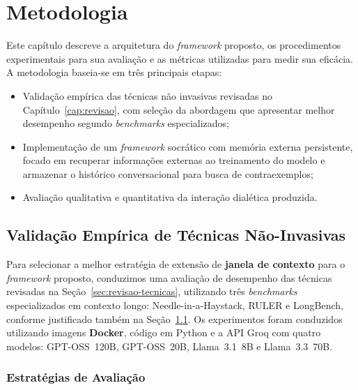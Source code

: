 \chapter{Metodologia}
\label{cap:metodologia}

Este capítulo descreve a arquitetura do \textit{framework} proposto, os procedimentos experimentais para sua avaliação e as métricas utilizadas para medir sua eficácia. A metodologia baseia-se em três principais etapas:
\begin{itemize}
    \item Validação empírica das técnicas não invasivas revisadas no Capítulo~\ref{cap:revisao}, com seleção da abordagem que apresentar melhor desempenho segundo \textit{benchmarks} especializados;

    \item Implementação de um \textit{framework} socrático com memória externa persistente, focado em recuperar informações externas ao treinamento do modelo e armazenar o histórico conversacional para busca de contraexemplos;

    \item Avaliação qualitativa e quantitativa da interação dialética produzida.
\end{itemize}

\section{Validação Empírica de Técnicas Não-Invasivas}
\label{sec:validacao-tecnicas}

Para selecionar a melhor estratégia de extensão de \textbf{janela de contexto} para o \textit{framework} proposto, conduzimos uma avaliação de desempenho das técnicas revisadas na Seção~\ref{sec:revisao-tecnicas}, utilizando três \textit{benchmarks} especializados em contexto longo: Needle-in-a-Haystack, RULER e LongBench, conforme justificado também na Seção~\ref{sec:validacao-tecnicas}. Os experimentos foram conduzidos utilizando imagens \textbf{Docker}, código em Python e a API Groq com quatro modelos: GPT-OSS~120B, GPT-OSS~20B, Llama~3.1~8B e Llama~3.3~70B.

\subsection{Estratégias de Avaliação}

